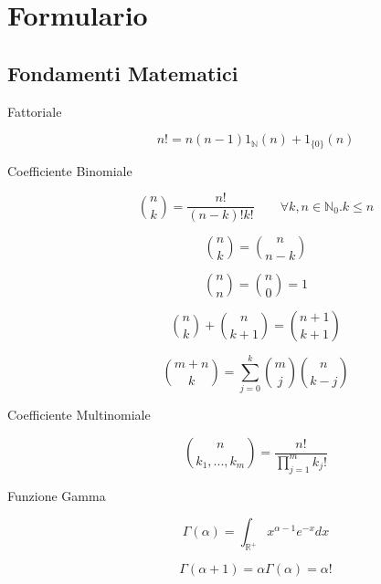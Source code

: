 \clearpage
\section{Formulario}
\label{sec:formulary}

\subsection{Fondamenti Matematici}
\begin{description}
	
	\item[Fattoriale]
		\begin{equation}
		n! = n(n-1)\mathfrak{1}_{\mathbb{N}}(n) + \mathfrak{1}_{\{0\}}(n)
		\end{equation}
	
	\item[Coefficiente Binomiale]
		\begin{equation}
		\binom{n}{k} = \frac{n!}{(n-k)!k!} \qquad\forall k,n\in\mathbb{N}_{0}.k\leq n
		\end{equation}
	
		\begin{equation}
		\binom{n}{k} = \binom{n}{n-k}
		\end{equation}
	
		\begin{equation}
		\binom{n}{n} = \binom{n}{0} = 1
		\end{equation}
		
		\begin{equation}
		\binom{n}{k}+\binom{n}{k+1} = \binom{n+1}{k+1}
		\end{equation}
		
		\begin{equation}
		\binom{m+n}{k} = \sum_{j=0}^{k}\binom{m}{j}\binom{n}{k-j}
		\end{equation}
	
	\item[Coefficiente Multinomiale]
		\begin{equation}
		\binom{n}{k_{1},...,k_{m}} = \frac{n!}{\prod_{j=1}^{m}k_{j}!}
		\end{equation}
	
	\item[Funzione Gamma]
		\begin{equation}
		\Gamma(\alpha) = \int_{\mathbb{R}^{+}} x^{\alpha-1}e^{-x}dx
		\end{equation}
		
		\begin{equation}
		\Gamma(\alpha+1) = 	\alpha\Gamma(\alpha) = \alpha!
		\end{equation}
		

\end{description}
